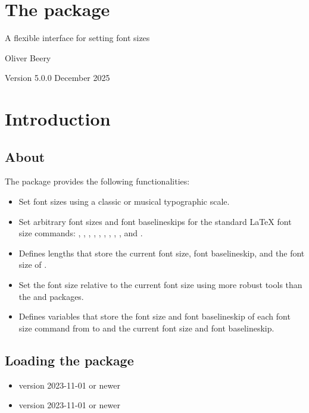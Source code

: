\documentclass{beerydoc}
\begin{document}
\section*{The  package}

A flexible interface for setting font sizes

Oliver Beery

Version 5.0.0 December 2025


\section{Introduction}
\label{sec:intro}

\subsection{About}
\label{subsec:about}

\listheading
  {The  package provides the following functionalities:}
\begin{itemize}
  \item
  Set font sizes using a classic or musical typographic scale.
  \item
  Set arbitrary font sizes and font baselineskips for the standard \LaTeX{}
  font size commands: , , ,
  , , , , , ,
  and .
  \item
  Defines lengths that store the current font size, font baselineskip, and the
  font size of .
  \item
  Set the font size relative to the current font size using more robust tools
  than the  and  packages.
  \item
  Defines  variables that store the font size and font baselineskip
  of each font size command from  to  and the current font
  size and font baselineskip.
\end{itemize}

\subsection{Loading the package}
\label{subsec:loading}

\begin{itemize}
  \item \LaTeXe{} version 2023-11-01 or newer
  \item {} version 2023-11-01 or newer
\end{itemize}
\end{document}
